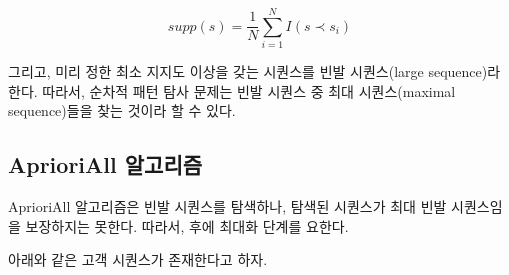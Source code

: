 \documentclass[
]{book}
\begin{document}
\begin{equation*}
supp(s) = \frac{1}{N} \sum_{i = 1}^{N} I(s \prec s_i)
\end{equation*}

그리고, 미리 정한 최소 지지도 이상을 갖는 시퀀스를 빈발 시퀀스(large sequence)라 한다. 따라서, 순차적 패턴 탐사 문제는 빈발 시퀀스 중 최대 시퀀스(maximal sequence)들을 찾는 것이라 할 수 있다.

\hypertarget{association-aprioriall}{%
\subsection{AprioriAll 알고리즘}\label{association-aprioriall}}

AprioriAll 알고리즘은 빈발 시퀀스를 탐색하나, 탐색된 시퀀스가 최대 빈발 시퀀스임을 보장하지는 못한다. 따라서, 후에 최대화 단계를 요한다.

아래와 같은 고객 시퀀스가 존재한다고 하자.
\end{document}
